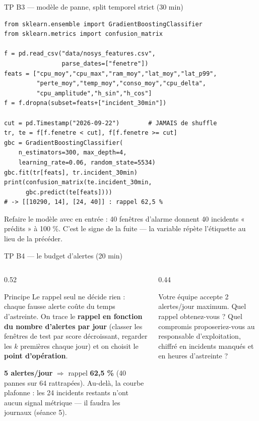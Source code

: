 \begin{frame}[fragile]{TP B3 --- modèle de panne, split temporel strict (30 min)}
\begin{codebox}
\begin{lstlisting}
from sklearn.ensemble import GradientBoostingClassifier
from sklearn.metrics import confusion_matrix

f = pd.read_csv("data/nosys_features.csv",
                parse_dates=["fenetre"])
feats = ["cpu_moy","cpu_max","ram_moy","lat_moy","lat_p99",
         "perte_moy","temp_moy","conso_moy","cpu_delta",
         "cpu_amplitude","h_sin","h_cos"]
f = f.dropna(subset=feats+["incident_30min"])

cut = pd.Timestamp("2026-09-22")        # JAMAIS de shuffle
tr, te = f[f.fenetre < cut], f[f.fenetre >= cut]
gbc = GradientBoostingClassifier(
    n_estimators=300, max_depth=4,
    learning_rate=0.06, random_state=5534)
gbc.fit(tr[feats], tr.incident_30min)
print(confusion_matrix(te.incident_30min,
      gbc.predict(te[feats])))
# -> [[10290, 14], [24, 40]] : rappel 62,5 %
\end{lstlisting}
\end{codebox}
\begin{abox}
Refaire le modèle avec  en entrée : 40 fenêtres d'alarme
donnent 40 incidents « prédits » à 100 \%. C'est le signe de la fuite
--- la variable répète l'étiquette au lieu de la précéder.
\end{abox}
\end{frame}

\begin{frame}{TP B4 --- le budget d'alertes (20 min)}
\begin{columns}[t]
\begin{column}{0.52\textwidth}
\begin{block}{Principe}
Le rappel seul ne décide rien : chaque fausse alerte coûte du temps
d'astreinte. On trace le \textbf{rappel en fonction du nombre
d'alertes par jour} (classer les fenêtres de test par score
décroissant, regarder les $k$ premières chaque jour) et on choisit le
\textbf{point d'opération}.
\end{block}
\begin{solbox}
\textbf{5 alertes/jour} $\Rightarrow$ rappel \textbf{62,5 \%}
(40 pannes sur 64 rattrapées). Au-delà, la courbe plafonne : les
24 incidents restants n'ont aucun signal métrique --- il faudra les
journaux (séance 5).
\end{solbox}
\end{column}
\begin{column}{0.44\textwidth}
\begin{qbox}
Votre équipe accepte 2 alertes/jour maximum. Quel rappel obtenez-vous ?
Quel compromis proposeriez-vous au responsable d'exploitation, chiffré
en incidents manqués et en heures d'astreinte ?
\end{qbox}
\end{column}
\end{columns}
\end{frame}

